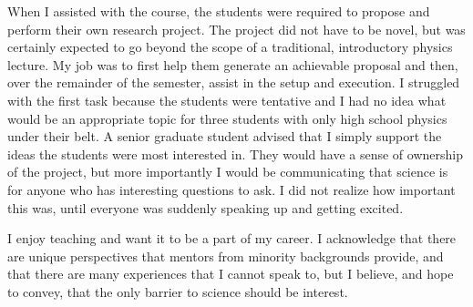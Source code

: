 \documentclass[12pt]{article}
\begin{document}
When I assisted with the course, the students were required to propose and perform their own research project. 
The project did not have to be novel, but was certainly expected to go beyond the scope of a traditional, introductory physics lecture.
My job was to first help them generate an achievable proposal and then, over the remainder of the semester, assist in the setup and execution.
I struggled with the first task because the students were tentative and I had no idea what would be an appropriate topic for three students with only high school physics under their belt.
A senior graduate student advised that I simply support the ideas the students were most interested in. They would have a sense of ownership of the project,
but more importantly I would be communicating that science is for anyone who has interesting questions to ask.
I did not realize how important this was, until everyone was suddenly speaking up and getting excited.

I enjoy teaching and want it to be a part of my career.
I acknowledge that there are unique perspectives that mentors from minority backgrounds provide, and that there are many experiences that I cannot speak to, but I believe, and hope to convey, that the only barrier to science should be interest.
\end{document}
